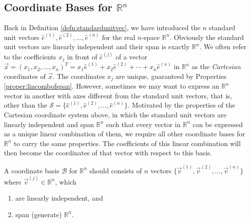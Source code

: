 \subsection{Coordinate Bases for $\mathbb{R}^n$}
\label{section:6.1.5}
Back in Definition \ref{defn:standardunitvec}, we have introduced the $n$ standard unit vectors $\hat{e}^{(1)}, \hat{e}^{(2)}, \ldots, \hat{e}^{(n)}$ for the real $n$-space $\mathbb{R}^n$. Obviously the standard unit vectors are linearly independent and their span is exactly $\mathbb{R}^n$. We often refer to the coefficients $x_j$ in front of $\hat{e}^{(j)}$ of a vector $\vec{x} = (x_1, x_2, \ldots, x_n)^T = x_1\hat{e}^{(1)} + x_2\hat{e}^{(2)} + \cdots + x_n\hat{e}^{(n)}$ in $\mathbb{R}^n$ as the \textit{Cartesian} coordinates of $\vec{x}$. The coordinates $x_j$ are unique, guaranteed by Properties \ref{proper:lincombofspan}. However, sometimes we may want to express an $\mathbb{R}^n$ vector in another  with axes different from the standard unit vectors, that is, other than the  $\mathcal{S} = \{\hat{e}^{(1)}, \hat{e}^{(2)}, \ldots, \hat{e}^{(n)}\}$. Motivated by the properties of the Cartesian coordinate system above, in which the standard unit vectors are linearly independent and span $\mathbb{R}^n$ such that every vector in $\mathbb{R}^n$ can be expressed as a unique linear combination of them, we require all other coordinate bases for $\mathbb{R}^n$ to carry the same properties. The coefficients of this linear combination will then become the coordinates of that vector with respect to this basis.
\begin{defn}
\label{defn:coordRn}
A coordinate basis $\mathcal{B}$ for $\mathbb{R}^n$ should consists of $n$ vectors $\{\vec{v}^{(1)}, \vec{v}^{(2)}, \ldots, \vec{v}^{(n)}\}$ where $\vec{v}^{(j)} \in \mathbb{R}^n$, which
\begin{enumerate}[label=(\alph*)]
\item are linearly independent, and
\item span (generate) $\mathbb{R}^n$.
\end{enumerate}
\end{defn}
